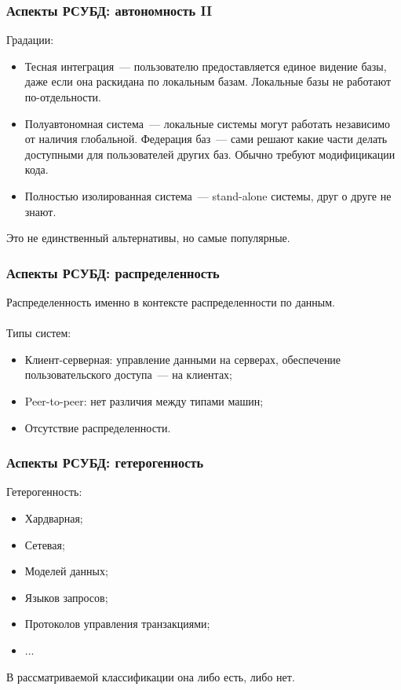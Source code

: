 \documentclass{beamer}
\begin{document}
\begin{frame}
\frametitle{Аспекты РСУБД: автономность II}
Градации:
	\begin{itemize}
		\item Тесная интеграция~--- пользователю предоставляется единое видение базы, даже если она раскидана по локальным базам. Локальные базы не работают по-отдельности.
		\item Полуавтономная система~--- локальные системы могут работать независимо от наличия глобальной. Федерация баз~--- сами решают какие части делать доступными для пользователей других баз. Обычно требуют модифицикации кода. 
		\item Полностью изолированная система~--- stand-alone системы, друг о друге не знают.
	\end{itemize}

Это не единственный альтернативы, но самые популярные.

\end{frame}

\begin{frame}
\frametitle{Аспекты РСУБД: распределенность}

Распределенность именно в контексте распределенности по данным.\\~\\

Типы систем:
  \begin{itemize}
    \setlength\itemsep{1em}  
    \item Клиент-серверная: управление данными на серверах, обеспечение пользовательского доступа~--- на клиентах;
    \item Peer-to-peer: нет различия между типами машин;
    \item Отсутствие распределенности.
  \end{itemize}

\end{frame}

\begin{frame}
\frametitle{Аспекты РСУБД: гетерогенность}

Гетерогенность:
  \begin{itemize}
    \setlength\itemsep{1em}  
    \item Хардварная;
    \item Сетевая;
    \item Моделей данных;
    \item Языков запросов;
    \item Протоколов управления транзакциями;
    \item ...
  \end{itemize}

В рассматриваемой классификации она либо есть, либо нет.

\end{frame}
\end{document}
